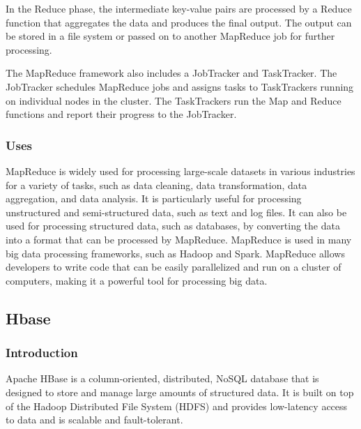 \documentclass[12pt]{article}
\begin{document}
In the Reduce phase, the intermediate key-value pairs are processed by a Reduce function that aggregates the data and produces the final output. The output can be stored in a file system or passed on to another MapReduce job for further processing.

The MapReduce framework also includes a JobTracker and TaskTracker. The JobTracker schedules MapReduce jobs and assigns tasks to TaskTrackers running on individual nodes in the cluster. The TaskTrackers run the Map and Reduce functions and report their progress to the JobTracker.
\subsubsection{Uses}
MapReduce is widely used for processing large-scale datasets in various industries for a variety of tasks, such as data cleaning, data transformation, data aggregation, and data analysis. It is particularly useful for processing unstructured and semi-structured data, such as text and log files. It can also be used for processing structured data, such as databases, by converting the data into a format that can be processed by MapReduce.
MapReduce is used in many big data processing frameworks, such as Hadoop and Spark. MapReduce allows developers to write code that can be easily parallelized and run on a cluster of computers, making it a powerful tool for processing big data.

\subsection{Hbase}
\subsubsection{Introduction}
Apache HBase is a column-oriented, distributed, NoSQL database that is designed to store and manage large amounts of structured data. It is built on top of the Hadoop Distributed File System (HDFS) and provides low-latency access to data and is scalable and fault-tolerant.
\end{document}
